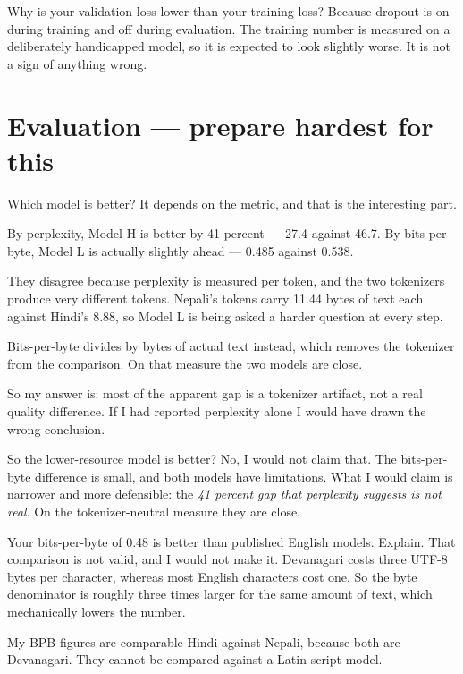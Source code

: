 \documentclass[11pt]{report}
\begin{document}
\begin{qabox}{Why is your validation loss lower than your training loss?}
Because dropout is on during training and off during evaluation. The training
number is measured on a deliberately handicapped model, so it is expected to look
slightly worse. It is not a sign of anything wrong.
\end{qabox}

\section{Evaluation --- prepare hardest for this}

\begin{qabox}{Which model is better?}
It depends on the metric, and that is the interesting part.

By perplexity, Model H is better by 41 percent --- 27.4 against 46.7. By
bits-per-byte, Model L is actually slightly ahead --- 0.485 against 0.538.

They disagree because perplexity is measured per token, and the two tokenizers
produce very different tokens. Nepali's tokens carry 11.44 bytes of text each
against Hindi's 8.88, so Model L is being asked a harder question at every step.

Bits-per-byte divides by bytes of actual text instead, which removes the tokenizer
from the comparison. On that measure the two models are close.

So my answer is: most of the apparent gap is a tokenizer artifact, not a real
quality difference. If I had reported perplexity alone I would have drawn the
wrong conclusion.
\end{qabox}

\begin{qabox}{So the lower-resource model is better?}
No, I would not claim that. The bits-per-byte difference is small, and both models
have limitations. What I would claim is narrower and more defensible: the
\emph{41 percent gap that perplexity suggests is not real}. On the
tokenizer-neutral measure they are close.
\end{qabox}

\begin{qabox}{Your bits-per-byte of 0.48 is better than published English models. Explain.}
That comparison is not valid, and I would not make it. Devanagari costs three
UTF-8 bytes per character, whereas most English characters cost one. So the byte
denominator is roughly three times larger for the same amount of text, which
mechanically lowers the number.

My BPB figures are comparable Hindi against Nepali, because both are Devanagari.
They cannot be compared against a Latin-script model.
\end{qabox}
\end{document}
